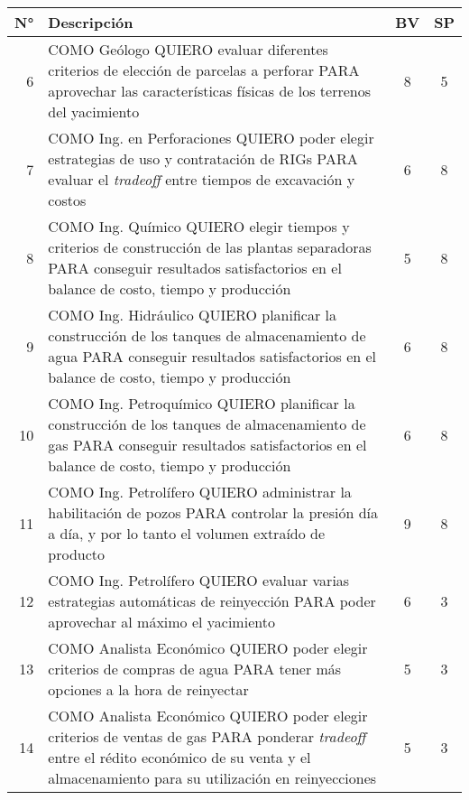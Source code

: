 \begin{center}
  \begin{tabular}{| r | p{13cm} | c | c | }
    \hline
    N° & Descripción & BV & SP\\  \hline

    6 & COMO Geólogo QUIERO evaluar diferentes criterios de elección de parcelas a perforar PARA aprovechar las características físicas de los terrenos del yacimiento & 8 & 5\\  \hline

    7 & COMO Ing. en Perforaciones QUIERO poder elegir estrategias de uso y contratación de RIGs PARA evaluar el \textit{tradeoff} entre tiempos de excavación y costos & 6 & 8\\ \hline

    8 & COMO Ing. Químico QUIERO elegir tiempos y criterios de construcción de las plantas separadoras PARA conseguir resultados satisfactorios en el balance de costo, tiempo y producción & 5 & 8\\ \hline

    9 & COMO Ing. Hidráulico QUIERO planificar la construcción de los tanques de almacenamiento de agua PARA conseguir resultados satisfactorios en el balance de costo, tiempo y producción & 6 & 8\\ \hline

    10 & COMO Ing. Petroquímico QUIERO planificar la construcción de los tanques de almacenamiento de gas PARA conseguir resultados satisfactorios en el balance de costo, tiempo y producción & 6 & 8\\ \hline
      
    11 & COMO Ing. Petrolífero QUIERO administrar la habilitación de pozos PARA controlar la presión día a día, y por lo tanto el volumen extraído de producto & 9 & 8\\ \hline

    12 & COMO Ing. Petrolífero QUIERO evaluar varias estrategias automáticas de reinyección PARA poder aprovechar al máximo el yacimiento & 6 & 3\\ \hline

    13 & COMO Analista Económico QUIERO poder elegir criterios de compras de agua PARA tener más opciones a la hora de reinyectar & 5 & 3\\ \hline

    14 & COMO Analista Económico QUIERO poder elegir criterios de ventas de gas PARA ponderar \textit{tradeoff} entre el rédito económico de su venta y el almacenamiento para su utilización en reinyecciones & 5 & 3\\ \hline


\end{tabular}
\end{center}
